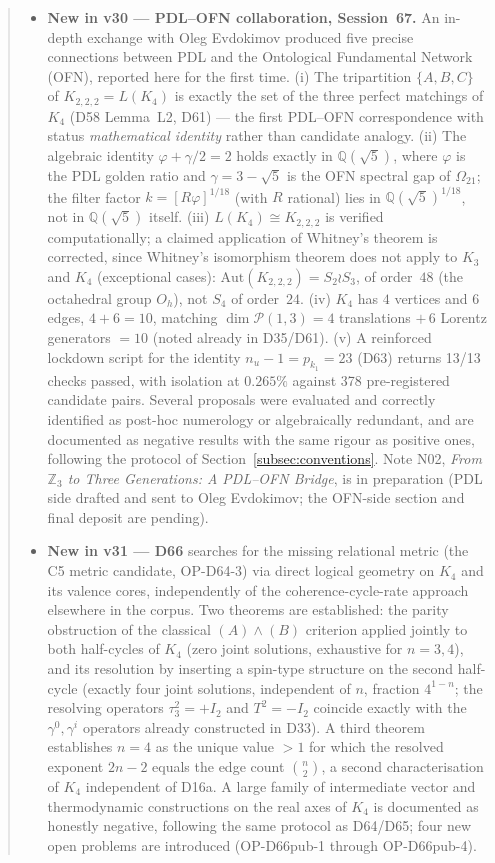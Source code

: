 \documentclass[11pt,a4paper]{article}
\theoremstyle{plain}
\theoremstyle{definition}
\theoremstyle{remark}
\newcommand{\Kfour}{K_4}
\begin{document}
\begin{abstract}
\begin{itemize}
\item \textbf{New in v30 --- PDL--OFN collaboration, Session~67.} An in-depth exchange with Oleg Evdokimov produced five precise connections between PDL and the Ontological Fundamental Network (OFN), reported here for the first time. (i) The tripartition $\{A,B,C\}$ of $K_{2,2,2} = L(K_4)$ is exactly the set of the three perfect matchings of $K_4$ (D58 Lemma~L2, D61) --- the first PDL--OFN correspondence with status \emph{mathematical identity} rather than candidate analogy. (ii) The algebraic identity $\varphi + \gamma/2 = 2$ holds exactly in $\mathbb{Q}(\sqrt{5})$, where $\varphi$ is the PDL golden ratio and $\gamma = 3-\sqrt{5}$ is the OFN spectral gap of $\Omega_{21}$; the filter factor $k = [R\varphi]^{1/18}$ (with $R$ rational) lies in $\mathbb{Q}(\sqrt{5})^{1/18}$, not in $\mathbb{Q}(\sqrt{5})$ itself. (iii) $L(K_4) \cong K_{2,2,2}$ is verified computationally; a claimed application of Whitney's theorem is corrected, since Whitney's isomorphism theorem does not apply to $K_3$ and $K_4$ (exceptional cases): $\mathrm{Aut}(K_{2,2,2}) = S_2\wr S_3$, of order~$48$ (the octahedral group $O_h$), not $S_4$ of order~$24$. (iv) $K_4$ has $4$ vertices and $6$ edges, $4+6=10$, matching $\dim\mathcal{P}(1,3) = 4$ translations $+\,6$ Lorentz generators $=10$ (noted already in D35/D61). (v) A reinforced lockdown script for the identity $n_u-1=p_{k_1}=23$ (D63) returns 13/13 checks passed, with isolation at $0.265\%$ against 378 pre-registered candidate pairs. Several proposals were evaluated and correctly identified as post-hoc numerology or algebraically redundant, and are documented as negative results with the same rigour as positive ones, following the protocol of Section~\ref{subsec:conventions}. Note N02, \emph{From $\mathbb{Z}_3$ to Three Generations: A PDL--OFN Bridge}, is in preparation (PDL side drafted and sent to Oleg Evdokimov; the OFN-side section and final deposit are pending).
\item \textbf{New in v31 --- D66} searches for the missing relational metric (the C5 metric candidate, OP-D64-3) via direct logical geometry on $K_4$ and its valence cores, independently of the coherence-cycle-rate approach elsewhere in the corpus. Two theorems are established: the parity obstruction of the classical $(A)\wedge(B)$ criterion applied jointly to both half-cycles of $K_4$ (zero joint solutions, exhaustive for $n=3,4$), and its resolution by inserting a spin-type structure on the second half-cycle (exactly four joint solutions, independent of $n$, fraction $4^{1-n}$; the resolving operators $\tau_3^2=+I_2$ and $T^2=-I_2$ coincide exactly with the $\gamma^0,\gamma^i$ operators already constructed in D33). A third theorem establishes $n=4$ as the unique value $>1$ for which the resolved exponent $2n-2$ equals the edge count $\binom{n}{2}$, a second characterisation of $\Kfour$ independent of D16a. A large family of intermediate vector and thermodynamic constructions on the real axes of $K_4$ is documented as honestly negative, following the same protocol as D64/D65; four new open problems are introduced (OP-D66pub-1 through OP-D66pub-4).

\end{itemize}
\end{abstract}
\end{document}
